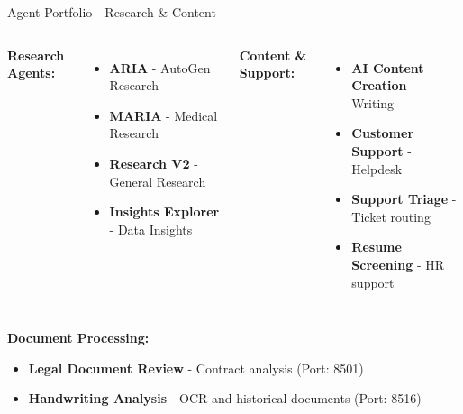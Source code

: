\documentclass[aspectratio=169,11pt]{beamer}
\begin{document}
\begin{frame}{Agent Portfolio - Research \& Content}
\begin{columns}
\textbf{Research Agents:}
\begin{itemize}
    \item \textbf{ARIA} - AutoGen Research
    \item \textbf{MARIA} - Medical Research
    \item \textbf{Research V2} - General Research
    \item \textbf{Insights Explorer} - Data Insights
\end{itemize}

\textbf{Content \& Support:}
\begin{itemize}
    \item \textbf{AI Content Creation} - Writing
    \item \textbf{Customer Support} - Helpdesk
    \item \textbf{Support Triage} - Ticket routing
    \item \textbf{Resume Screening} - HR support
\end{itemize}
\end{columns}

\vspace{0.5cm}
\textbf{Document Processing:}
\begin{itemize}
    \item \textbf{Legal Document Review} - Contract analysis (Port: 8501)
    \item \textbf{Handwriting Analysis} - OCR and historical documents (Port: 8516)
\end{itemize}
\end{frame}
\end{document}
